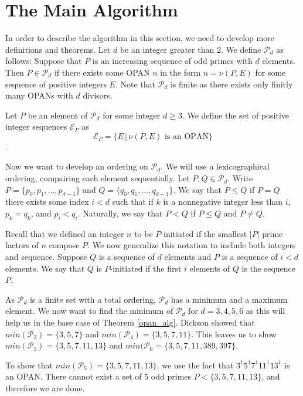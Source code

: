 \documentclass[../paper.tex]{subfiles}
\begin{document}
\section{The Main Algorithm}

In order to describe the algorithm in this section, we need to
develop more definitions and theorems. Let $d$ be an integer
greater than 2. We define $\mathcal{P}_d$ as follows: Suppose that
$P$ is an increasing sequence of odd primes with $d$ elements.
Then $P \in \mathcal{P}_d$ if there exists some OPAN $n$ in the 
form $n = \nu (P, E)$ for some sequence of positive integers $E$.
Note that $\mathcal{P}_d$ is finite as there exists only finitly
many OPANs with $d$ divisors{\cite{dickson}}.

Let $P$ be an element of $\mathcal{P}_d$ for some integer $d \geq 
3$. We define the set of positive integer sequences 
$\mathcal{E}_P$ as 
%
$$\mathcal{E}_P = \{E\, |\, \nu(P, E) \text{ is an OPAN}\}$$.
%

Now we want to develop an ordering on $\mathcal{P}_d$. We will use
a lexicographical ordering, compairing each element sequentially.
Let $P, Q \in \mathcal{P}_d$. Write $P = \{p_0, p_1, ..., p_{d-1}\}$
and $Q = \{q_0, q_1, ..., q_{d-1}\}$. We say that $P \leq Q$ if $P = Q$ 
there exists some index $i < d$ such that if $k$ is a nonnegative integer
less than $i$, $p_k = q_k$, amd $p_i < q_i$. Naturally, we say that 
$P < Q$ if $P \leq Q$ and $P \neq Q$. 

Recall that we defined an integer $n$ to be $P$-initiated if the
smallest $|P|$ prime factors of $n$ compose $P$. We now generalize
this notation to include both integers and sequence. Suppose $Q$
is a sequence of $d$ elements and $P$ is a sequence of $i < d$
elements. We say that $Q$ is $P$-initiated if the first $i$
elements of $Q$ is the sequence $P$.

As $\mathcal{P}_d$ is a finite set with a total ordering,
$\mathcal{P}_d$ has a minimum and a maximum element. We now want
to find the minimum of $\mathcal{P}_d$ for $d = 3, 4, 5, 6$ as
this will help us in the base case of Theorem {\ref{opan_alg}}.
Dickson showed that $min(\mathcal{P}_3) = \{3, 5, 7\}$ and
$min(\mathcal{P}_4) = \{3, 5, 7, 11\}$. This leaves us to show
$min(\mathcal{P}_5) = \{3, 5, 7, 11, 13\}$ and $min(\mathcal{P}_6
= \{3, 5, 7, 11, 389, 397\}$.

To show that $min(\mathcal{P}_5) = \{3, 5, 7, 11, 13\}$, we use
the fact that $3^1 5^1 7^1 11^1 13^1$ is an OPAN. There cannot
exist a set of 5 odd primes $P < \{3, 5, 7, 11, 13\}$, and
therefore we are done.
\end{document}
